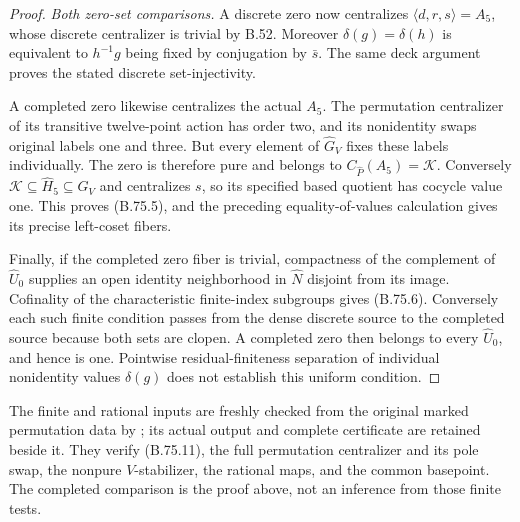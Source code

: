 \begin{proof}
\emph{Both zero-set comparisons.}
A discrete zero now centralizes \(\langle d,r,s\rangle=A_5\),
whose discrete centralizer is trivial by B.52.
Moreover \(\delta(g)=\delta(h)\) is equivalent to
\(h^{-1}g\) being fixed by conjugation by \(\bar s\).
The same deck argument proves the stated discrete
set-injectivity.

A completed zero likewise centralizes the actual \(A_5\).
The permutation centralizer of its transitive twelve-point
action has order two, and its nonidentity swaps original
labels one and three.  But every element of
\(\widehat G_V\) fixes these labels individually.
The zero is therefore pure and belongs to
\(C_{\widehat P}(A_5)=\mathcal K\).
Conversely \(\mathcal K\subseteq\widehat H_5\subseteq
\widehat G_V\) and centralizes \(s\), so its specified
based quotient has cocycle value one.  This proves
(B.75.5), and the preceding equality-of-values calculation
gives its precise left-coset fibers.

Finally, if the completed zero fiber is trivial, compactness
of the complement of \(\widehat U_0\) supplies an open
identity neighborhood in \(\widehat N\) disjoint from its
image.  Cofinality of the characteristic finite-index
subgroups gives (B.75.6).
Conversely each such finite condition passes from the dense
discrete source to the completed source because both sets
are clopen.  A completed zero then belongs to every
\(\widehat U_0\), and hence is one.
Pointwise residual-finiteness separation of individual
nonidentity values \(\delta(g)\) does not establish this
uniform condition.
\end{proof}

The finite and rational inputs are freshly checked from the
original marked permutation data by
;
its actual output and complete certificate are retained beside it.
They verify (B.75.11), the full permutation centralizer and its
pole swap, the nonpure \(V\)-stabilizer, the rational maps,
and the common basepoint.  The completed comparison is the
proof above, not an inference from those finite tests.

